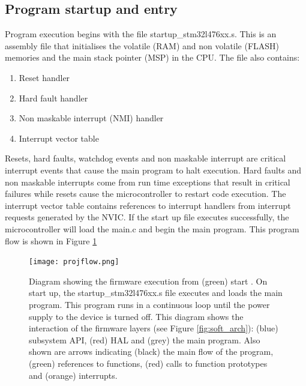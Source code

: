 \subsection{Program startup and entry}

Program execution begins with the file startup\_stm32l476xx.s. This is an assembly file that initialises the volatile (RAM) and non volatile (FLASH) memories and the main stack pointer (MSP) in the CPU. The file also contains:

\begin{enumerate}
\item Reset handler
\item Hard fault handler
\item Non maskable interrupt (NMI) handler
\item Interrupt vector table
\end{enumerate}

Resets, hard faults, watchdog events and non maskable interrupt are critical interrupt events that cause the main program to halt execution. Hard faults and non maskable interrupts come from run time exceptions that result in critical failures while resets cause the microcontroller to restart code execution. The interrupt vector table contains references to interrupt handlers from interrupt requests generated by the NVIC. If the start up file executes successfully, the microcontroller will load the main.c and begin the main program. This program flow is shown in Figure \ref{fig:progflow}\par 

\begin{figure}[H]
	\centering
	\texttt{[image: projflow.png]}
	\caption{Diagram showing the firmware execution from (green) start . On start up, the startup\_stm32l476xx.s file executes and loads the main program. This program runs in a continuous loop until the power supply to the device is turned off. This diagram shows the interaction of the firmware layers (see Figure \ref{fig:soft_arch}): (blue) subsystem API, (red) HAL and (grey) the main program. Also shown are arrows indicating (black) the main flow of the program, (green) references  to functions, (red) calls to function prototypes and (orange) interrupts.}
	\label{fig:progflow}
\end{figure}

